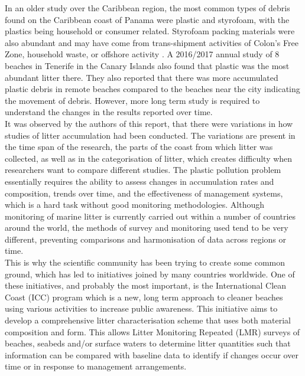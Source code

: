 \documentclass[10pt]{article}\usepackage[]{graphicx}\usepackage[]{color}
\begin{document}
In an older study over the Caribbean region, the most common types of debris found on the Caribbean coast of Panama were plastic and styrofoam, with the plastics being household or consumer related. Styrofoam packing materials were also abundant and may have come from trans-shipment activities of Colon's Free Zone, household waste, or offshore activity \cite{GARRITY1993}. A 2016/2017 annual study of 8 beaches in Tenerife in the Canary Islands also found that plastic was the most abundant litter there. They also reported that there was more accumulated plastic debris in remote beaches compared to the beaches near the city indicating the movement of debris. However, more long term study is required to understand the changes in the results reported over time. \cite{REINOLD2020} \\

It was observed by the authors of this report, that there were variations in how studies of litter accumulation had been conducted. The variations are present in the time span of the research, the parts of the coast from which litter was collected, as well as in the categorisation of litter, which creates difficulty when researchers want to compare different studies. The plastic pollution problem essentially requires the ability to assess changes in accumulation rates and composition, trends over time, and the effectiveness of management systems, which is a hard task without good monitoring methodologies. Although monitoring of marine litter is currently carried out within a number of countries around the world, the methods of survey and monitoring used tend to be very different, preventing comparisons and harmonisation of data across regions or time. \\

This is why the scientific community has been trying to create some common ground, which has led to initiatives joined by many countries worldwide. One of these initiatives, and probably the most important, is the International Clean Coast (ICC) program which is a new, long term approach to cleaner beaches using various activities to increase public awareness. \cite{ CHESHIRE2009} This initiative aims to develop a comprehensive litter characterisation scheme that uses both material composition and form. This allows Litter Monitoring Repeated (LMR) surveys of beaches, seabeds and/or surface waters to determine litter quantities such that information can be compared with baseline data to identify if changes occur over time or in response to management arrangements. \\
\end{document}
